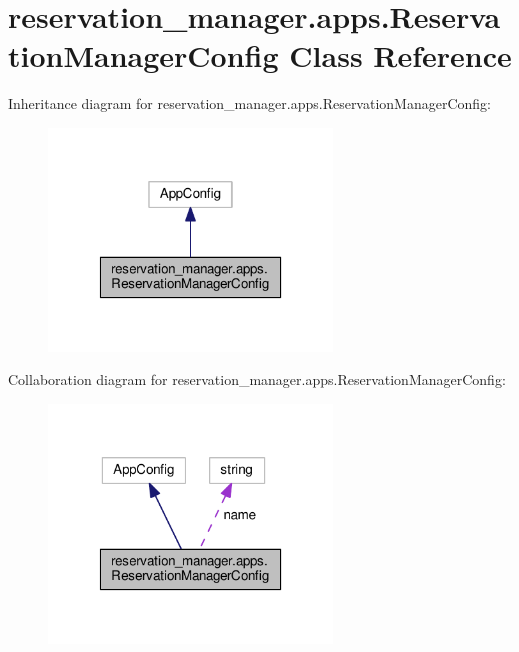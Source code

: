 \hypertarget{classreservation__manager_1_1apps_1_1ReservationManagerConfig}{\section{reservation\-\_\-manager.\-apps.\-Reservation\-Manager\-Config Class Reference}
\label{classreservation__manager_1_1apps_1_1ReservationManagerConfig}
}


Inheritance diagram for reservation\-\_\-manager.\-apps.\-Reservation\-Manager\-Config\-:
\nopagebreak
\begin{figure}[H]
\begin{center}
\leavevmode
\includegraphics[width=214pt]{classreservation__manager_1_1apps_1_1ReservationManagerConfig__inherit__graph}
\end{center}
\end{figure}


Collaboration diagram for reservation\-\_\-manager.\-apps.\-Reservation\-Manager\-Config\-:
\nopagebreak
\begin{figure}[H]
\begin{center}
\leavevmode
\includegraphics[width=214pt]{classreservation__manager_1_1apps_1_1ReservationManagerConfig__coll__graph}
\end{center}
\end{figure}

